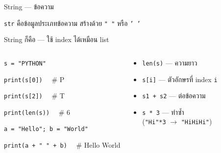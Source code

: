 \documentclass[11pt, aspectratio=169]{beamer}
\newcommand{\py}[1]{\texttt{#1}}
\begin{document}
\begin{frame}{String — ข้อความ}
  \begin{explanation}[นิยาม]
    \py{str} คือข้อมูลประเภทข้อความ สร้างด้วย \py{" "} หรือ \py{' '}

    String ก็คือ  — ใช้ index ได้เหมือน list
  \end{explanation}
  \begin{columns}[T]
      \begin{exambox}
        \py{s = "PYTHON"}

        \py{print(s[0])} \ \ {\small \# P}

        \py{print(s[2])} \ \ {\small \# T}

        \py{print(len(s))} \ \ {\small \# 6}

        \py{a = "Hello"; b = "World"}

        \py{print(a + " " + b)} \ \ {\small \# Hello World}
      \end{exambox}
      \begin{explanation}
        \begin{itemize}
          \item \py{len(s)} — ความยาว
          \item \py{s[i]} — ตัวอักษรที่ index \py{i}
          \item \py{s1 + s2} — ต่อข้อความ
          \item \py{s * 3} — ทำซํ้า \\
          (\py{"Hi"*3} $\rightarrow$ \py{"HiHiHi"})
        \end{itemize}
      \end{explanation}
  \end{columns}
\end{frame}
\end{document}
